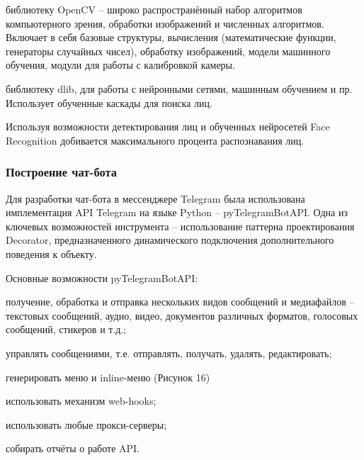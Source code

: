 \begin{itemize*}
\item библиотеку OpenCV -- широко распространённый набор алгоритмов компьютерного зрения, обработки изображений и численных алгоритмов. Включает в себя базовые структуры, вычисления (математические функции, генераторы случайных чисел), обработку изображений, модели машинного обучения, модули для работы с калибровкой камеры.
\item библиотеку dlib, для работы с нейронными сетями, машинным обучением и пр. Использует обученные каскады для поиска лиц.
\end{itemize*}

Используя возможности детектирования лиц и обученных нейросетей Face Recognition добивается максимального процента распознавания лиц.

\subsubsection{Построение чат-бота}
Для разработки чат-бота в мессенджере Telegram была использована имплементация API Telegram на языке Python -- pyTelegramBotAPI. Одна из ключевых возможностей инструмента -- использование паттерна проектирования Decorator, предназначенного динамического подключения дополнительного поведения к объекту.

Основные возможности pyTelegramBotAPI:

\begin{itemize*}
\item получение, обработка и отправка нескольких видов сообщений и медиафайлов -- текстовых сообщений, аудио, видео, документов различных форматов, голосовых сообщений, стикеров и т.д.;
\item управлять сообщениями, т.е. отправлять, получать, удалять, редактировать;
\item генерировать меню и inline-меню (Рисунок 16)
\item использовать механизм web-hooks;
\item использовать любые прокси-серверы;
\item собирать отчёты о работе API.
\end{itemize*}


